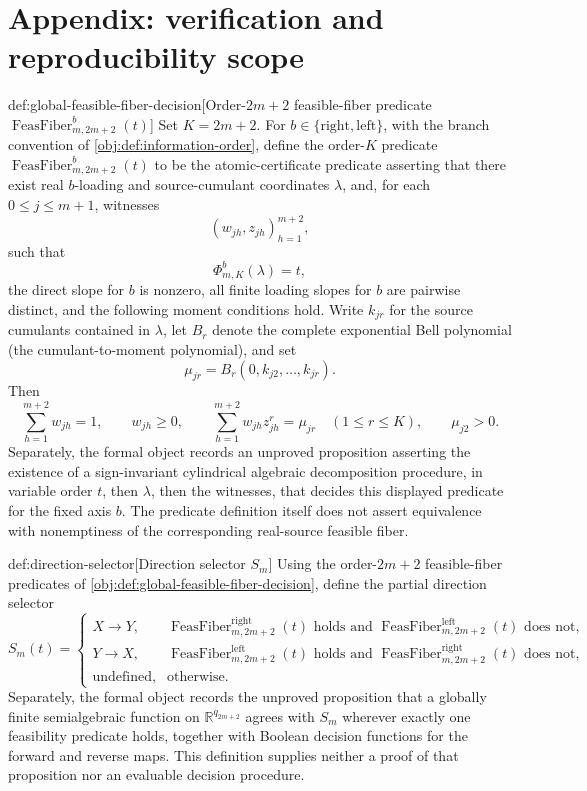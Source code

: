 \section{Appendix: verification and reproducibility scope}

\begin{definitionv}{def:global-feasible-fiber-decision}[Order-\(2m+2\) feasible-fiber predicate \(\operatorname{FeasFiber}^{b}_{m,2m+2}(t)\)]
Set \(K=2m+2\). For \(b\in\{\mathrm{right},\mathrm{left}\}\), with the branch convention of \cref{obj:def:information-order}, define the order-\(K\) predicate \(\operatorname{FeasFiber}^{b}_{m,2m+2}(t)\) to be the atomic-certificate predicate asserting that there exist real \(b\)-loading and source-cumulant coordinates \(\lambda\), and, for each \(0\leq j\leq m+1\), witnesses
\[
(w_{jh},z_{jh})_{h=1}^{m+2},
\]
such that
\[
\Phi^b_{m,K}(\lambda)=t,
\]
the direct slope for \(b\) is nonzero, all finite loading slopes for \(b\) are pairwise distinct, and the following moment conditions hold. Write \(k_{jr}\) for the source cumulants contained in \(\lambda\), let \(B_r\) denote the complete exponential Bell polynomial (the cumulant-to-moment polynomial), and set
\[
\mu_{jr}=B_r(0,k_{j2},\ldots,k_{jr}).
\]
Then
\[
\sum_{h=1}^{m+2} w_{jh}=1,\qquad
w_{jh}\geq 0,\qquad
\sum_{h=1}^{m+2} w_{jh}z_{jh}^r=\mu_{jr}\quad(1\leq r\leq K),
\qquad
\mu_{j2}>0.
\]
Separately, the formal object records an unproved proposition asserting the existence of a sign-invariant cylindrical algebraic decomposition procedure, in variable order \(t\), then \(\lambda\), then the witnesses, that decides this displayed predicate for the fixed axis \(b\). The predicate definition itself does not assert equivalence with nonemptiness of the corresponding real-source feasible fiber.
\end{definitionv}

\begin{definitionv}{def:direction-selector}[Direction selector \(S_m\)]
Using the order-\(2m+2\) feasible-fiber predicates of \cref{obj:def:global-feasible-fiber-decision}, define the partial direction selector
\[
S_m(t)=
\begin{cases}
X\to Y,&\operatorname{FeasFiber}^{\mathrm{right}}_{m,2m+2}(t)\text{ holds and }\operatorname{FeasFiber}^{\mathrm{left}}_{m,2m+2}(t)\text{ does not},\\
Y\to X,&\operatorname{FeasFiber}^{\mathrm{left}}_{m,2m+2}(t)\text{ holds and }\operatorname{FeasFiber}^{\mathrm{right}}_{m,2m+2}(t)\text{ does not},\\
\text{undefined},&\text{otherwise}.
\end{cases}
\]
Separately, the formal object records the unproved proposition that a globally finite semialgebraic function on \(\mathbb R^{q_{2m+2}}\) agrees with \(S_m\) wherever exactly one feasibility predicate holds, together with Boolean decision functions for the forward and reverse maps. This definition supplies neither a proof of that proposition nor an evaluable decision procedure.
\end{definitionv}


